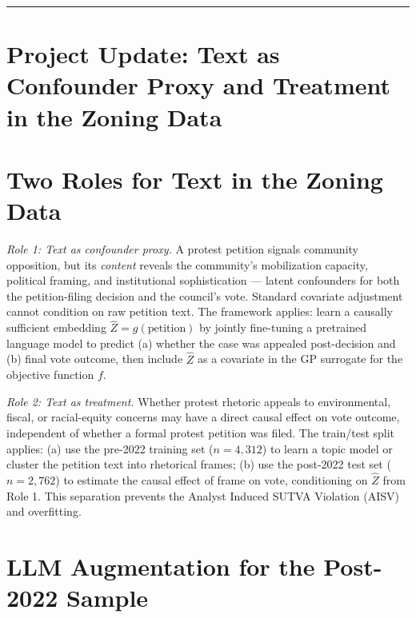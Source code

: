\documentclass[11pt,twoside]{article}
\begin{document}
\newpage
\vspace{1em}
\hrule
\vspace{1em}
\section*{Project Update: Text as Confounder Proxy and Treatment in the Zoning Data}
\thispagestyle{empty}

\begin{abstract}
The Austin zoning dataset contains public testimony --- oral and written comment --- associated with each of the 7,074 cases. This week I formalize how text enters the causal model in two distinct roles and map each role to the appropriate method from the readings.
\end{abstract}

\section*{Two Roles for Text in the Zoning Data}

\textit{Role 1: Text as confounder proxy.}
A protest petition signals community opposition, but its \textit{content} reveals the community's mobilization capacity, political framing, and institutional sophistication --- latent confounders for both the petition-filing decision and the council's vote. Standard covariate adjustment cannot condition on raw petition text. The \citet{veitch2020adapting} framework applies: learn a causally sufficient embedding $\hat{Z} = g(\text{petition})$ by jointly fine-tuning a pretrained language model to predict (a) whether the case was appealed post-decision and (b) final vote outcome, then include $\hat{Z}$ as a covariate in the GP surrogate for the objective function $f$.

\textit{Role 2: Text as treatment.}
Whether protest rhetoric appeals to environmental, fiscal, or racial-equity concerns may have a direct causal effect on vote outcome, independent of whether a formal protest petition was filed. The \citet{egami2022texts} train/test split applies: (a) use the pre-2022 training set ($n = 4{,}312$) to learn a topic model or cluster the petition text into rhetorical frames; (b) use the post-2022 test set ($n = 2{,}762$) to estimate the causal effect of frame on vote, conditioning on $\hat{Z}$ from Role 1. This separation prevents the Analyst Induced SUTVA Violation (AISV) and overfitting.

\section*{LLM Augmentation for the Post-2022 Sample}
\end{document}

